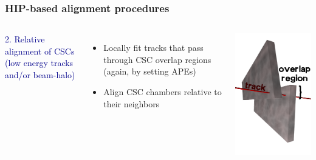 \documentclass[compress]{beamer}
\begin{document}
\begin{frame}
\frametitle{HIP-based alignment procedures}

\begin{columns}
\textcolor{darkblue}{2. Relative alignment of CSCs (low energy tracks \\ \hfill and/or beam-halo)}
\begin{itemize}
\item Locally fit tracks that pass through CSC overlap regions (again,
by setting APEs)
\item Align CSC chambers relative to their neighbors
\end{itemize}

\includegraphics[width=\linewidth]{overlap.png}
\end{columns}


\end{frame}
\end{document}
